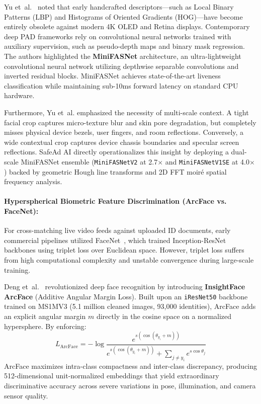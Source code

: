 \documentclass[12pt,a4paper]{report}
\begin{document}
Yu et~al.~\cite{yu2023} noted that early handcrafted descriptors---such as Local Binary Patterns (LBP) and Histograms of Oriented Gradients (HOG)---have become entirely obsolete against modern 4K OLED and Retina displays. Contemporary deep PAD frameworks rely on convolutional neural networks trained with auxiliary supervision, such as pseudo-depth maps and binary mask regression. The authors highlighted the \textbf{MiniFASNet} architecture, an ultra-lightweight convolutional neural network utilizing depthwise separable convolutions and inverted residual blocks. MiniFASNet achieves state-of-the-art liveness classification while maintaining sub-10ms forward latency on standard CPU hardware.

Furthermore, Yu et~al. emphasized the necessity of multi-scale context. A tight facial crop captures micro-texture blur and skin pore degradation, but completely misses physical device bezels, user fingers, and room reflections. Conversely, a wide contextual crop captures device chassis boundaries and specular screen reflections. SafeAd AI directly operationalizes this insight by deploying a dual-scale MiniFASNet ensemble (\texttt{MiniFASNetV2} at 2.7$\times$ and \texttt{MiniFASNetV1SE} at 4.0$\times$) backed by geometric Hough line transforms and 2D FFT moir\'{e} spatial frequency analysis.

\paragraph{Hyperspherical Biometric Feature Discrimination (ArcFace vs. FaceNet):}
For cross-matching live video feeds against uploaded ID documents, early commercial pipelines utilized FaceNet~\cite{schroff2015facenet}, which trained Inception-ResNet backbones using triplet loss over Euclidean space. However, triplet loss suffers from high computational complexity and unstable convergence during large-scale training.

Deng et~al.~\cite{deng2019arcface} revolutionized deep face recognition by introducing \textbf{InsightFace ArcFace} (Additive Angular Margin Loss). Built upon an \texttt{iResNet50} backbone trained on MS1MV3 (5.1 million cleaned images, 93,000 identities), ArcFace adds an explicit angular margin $m$ directly in the cosine space on a normalized hypersphere. By enforcing:
\begin{equation}
L_{\text{ArcFace}} = -\log \frac{e^{s(\cos(\theta_{y_i} + m))}}{e^{s(\cos(\theta_{y_i} + m))} + \sum_{j \ne y_i} e^{s \cos \theta_j}}
\end{equation}
ArcFace maximizes intra-class compactness and inter-class discrepancy, producing 512-dimensional unit-normalized embeddings that yield extraordinary discriminative accuracy across severe variations in pose, illumination, and camera sensor quality.
\end{document}
